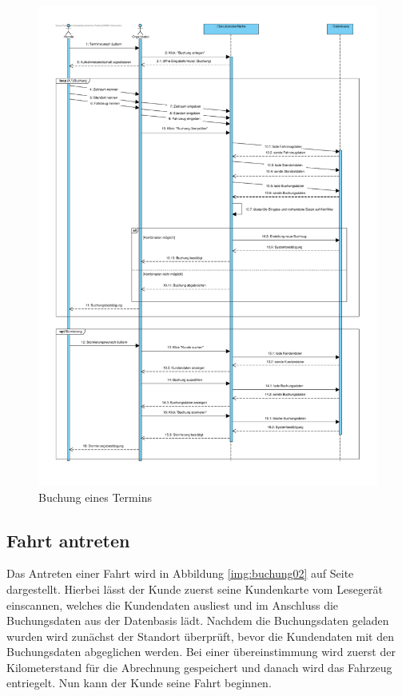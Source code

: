 \begin{figure}[!ht]
    \centering
    \includegraphics[width=\textwidth, height=\textheight-4cm]{Bilder/Diagramme/SD_Buchungsvorgang_01.pdf}
    \caption{Buchung eines Termins}
    \label{img:buchung01}
\end{figure}


\clearpage

\subsection{Fahrt antreten}

Das Antreten einer Fahrt wird in Abbildung \ref{img:buchung02} auf Seite \pageref{img:buchung02} dargestellt. Hierbei lässt der Kunde zuerst seine Kundenkarte vom Lesegerät einscannen, welches die Kundendaten ausliest und im Anschluss die Buchungsdaten aus der Datenbasis lädt. Nachdem die Buchungsdaten geladen wurden wird zunächst der Standort überprüft, bevor die Kundendaten mit den Buchungsdaten abgeglichen werden. Bei einer übereinstimmung wird zuerst der Kilometerstand für die Abrechnung gespeichert und danach wird das Fahrzeug entriegelt. Nun kann der Kunde seine Fahrt beginnen. 


